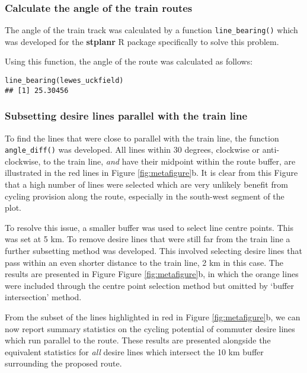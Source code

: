 \documentclass[11pt]{article}
\begin{document}
\subsubsection{Calculate the angle of the train
routes}\label{calculate-the-angle-of-the-train-routes}

The angle of the train track was calculated by a function
\texttt{line\_bearing()} which was developed for the \textbf{stplanr} R
package specifically to solve this problem.

Using this function, the angle of the route was calculated as follows:

\begin{verbatim}
line_bearing(lewes_uckfield)
## [1] 25.30456
\end{verbatim}

\subsubsection{Subsetting desire lines parallel with the train
line}\label{subsetting-desire-lines-parallel-with-the-train-line}

To find the lines that were close to parallel with the train line, the
function \texttt{angle\_diff()} was developed. All lines within 30
degrees, clockwise or anti-clockwise, to the train line, \emph{and} have
their midpoint within the route buffer, are illustrated in the red lines
in Figure \ref{fig:metafigure}b. It is clear from this Figure that a
high number of lines were selected which are very unlikely benefit from
cycling provision along the route, especially in the south-west segment
of the plot.

To resolve this issue, a smaller buffer was used to select line centre
points. This was set at 5 km. To remove desire lines that were still far
from the train line a further subsetting method was developed. This
involved selecting desire lines that pass within an even shorter
distance to the train line, 2 km in this case. The results are presented
in Figure Figure \ref{fig:metafigure}b, in which the orange lines were
included through the centre point selection method but omitted by
`buffer intersection' method.

From the subset of the lines highlighted in red in Figure
\ref{fig:metafigure}b, we can now report summary statistics on the
cycling potential of commuter desire lines which run parallel to the
route. These results are presented alongside the
equivalent statistics for \emph{all} desire lines which intersect the 10
km buffer surrounding the proposed route.
\end{document}
